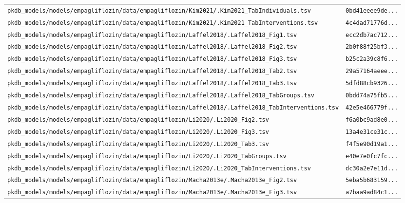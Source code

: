 \begin{longtable}{ll}
\texttt{pkdb\_models/models/empagliflozin/data/empagliflozin/Kim2021/.Kim2021\_TabIndividuals.tsv} & \texttt{0bd41eeee9de...} \\
\texttt{pkdb\_models/models/empagliflozin/data/empagliflozin/Kim2021/.Kim2021\_TabInterventions.tsv} & \texttt{4c4dad71776d...} \\
\texttt{pkdb\_models/models/empagliflozin/data/empagliflozin/Laffel2018/.Laffel2018\_Fig1.tsv} & \texttt{ecc2db7ac712...} \\
\texttt{pkdb\_models/models/empagliflozin/data/empagliflozin/Laffel2018/.Laffel2018\_Fig2.tsv} & \texttt{2b0f88f25bf3...} \\
\texttt{pkdb\_models/models/empagliflozin/data/empagliflozin/Laffel2018/.Laffel2018\_Fig3.tsv} & \texttt{b25c2a39c8f6...} \\
\texttt{pkdb\_models/models/empagliflozin/data/empagliflozin/Laffel2018/.Laffel2018\_Tab2.tsv} & \texttt{29a57164aeee...} \\
\texttt{pkdb\_models/models/empagliflozin/data/empagliflozin/Laffel2018/.Laffel2018\_Tab3.tsv} & \texttt{5dfd88cb9326...} \\
\texttt{pkdb\_models/models/empagliflozin/data/empagliflozin/Laffel2018/.Laffel2018\_TabGroups.tsv} & \texttt{0bdd74a75fb5...} \\
\texttt{pkdb\_models/models/empagliflozin/data/empagliflozin/Laffel2018/.Laffel2018\_TabInterventions.tsv} & \texttt{42e5e466779f...} \\
\texttt{pkdb\_models/models/empagliflozin/data/empagliflozin/Li2020/.Li2020\_Fig2.tsv} & \texttt{f6a0bc9ad8e0...} \\
\texttt{pkdb\_models/models/empagliflozin/data/empagliflozin/Li2020/.Li2020\_Fig3.tsv} & \texttt{13a4e31ce31c...} \\
\texttt{pkdb\_models/models/empagliflozin/data/empagliflozin/Li2020/.Li2020\_Tab3.tsv} & \texttt{f4f5e90d19a1...} \\
\texttt{pkdb\_models/models/empagliflozin/data/empagliflozin/Li2020/.Li2020\_TabGroups.tsv} & \texttt{e40e7e0fc7fc...} \\
\texttt{pkdb\_models/models/empagliflozin/data/empagliflozin/Li2020/.Li2020\_TabInterventions.tsv} & \texttt{dc30a2e7e11d...} \\
\texttt{pkdb\_models/models/empagliflozin/data/empagliflozin/Macha2013e/.Macha2013e\_Fig2.tsv} & \texttt{5eba5b683159...} \\
\texttt{pkdb\_models/models/empagliflozin/data/empagliflozin/Macha2013e/.Macha2013e\_Fig3.tsv} & \texttt{a7baa9ad84c1...} \\

\end{longtable}

